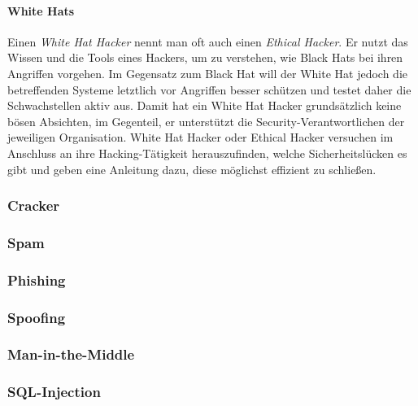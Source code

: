 \paragraph{White Hats} Einen \textit{White Hat Hacker} nennt man oft auch einen \textit{Ethical Hacker}. Er nutzt das Wissen und die Tools eines Hackers, um zu verstehen, wie Black Hats bei ihren Angriffen vorgehen. Im Gegensatz zum Black Hat will der White Hat jedoch die betreffenden Systeme letztlich vor Angriffen besser schützen und testet daher die Schwachstellen aktiv aus. Damit hat ein White Hat Hacker grundsätzlich keine bösen Absichten, im Gegenteil, er unterstützt die Security-Verantwortlichen der jeweiligen Organisation. White Hat Hacker oder Ethical Hacker versuchen im Anschluss an ihre Hacking-Tätigkeit herauszufinden, welche Sicherheitslücken es gibt und geben eine Anleitung dazu, diese möglichst effizient zu schließen.

\subsubsection{Cracker}
\label{sec:Cracker}


\subsubsection{Spam}
\label{sec:Spam}


\subsubsection{Phishing}
\label{sec:Phishing}


\subsubsection{Spoofing}
\label{sec:Spoofing}


\subsubsection{Man-in-the-Middle}
\label{sec:ManInTheMiddle}


\subsubsection{SQL-Injection}

